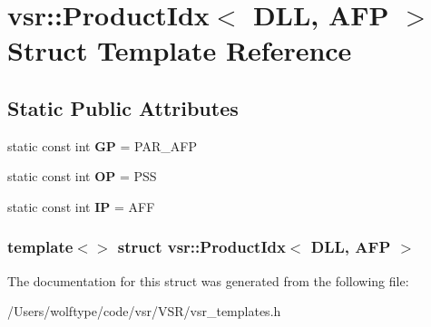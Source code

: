 \hypertarget{structvsr_1_1_product_idx_3_01_d_l_l_00_01_a_f_p_01_4}{\section{vsr\-:\-:Product\-Idx$<$ D\-L\-L, A\-F\-P $>$ Struct Template Reference}
\label{structvsr_1_1_product_idx_3_01_d_l_l_00_01_a_f_p_01_4}
}
\subsection*{Static Public Attributes}
\begin{DoxyCompactItemize}
\item 
\hypertarget{structvsr_1_1_product_idx_3_01_d_l_l_00_01_a_f_p_01_4_a6a031ae6a9d05221ce8925ab2350b038}{static const int {\bfseries G\-P} = P\-A\-R\-\_\-\-A\-F\-P}\label{structvsr_1_1_product_idx_3_01_d_l_l_00_01_a_f_p_01_4_a6a031ae6a9d05221ce8925ab2350b038}

\item 
\hypertarget{structvsr_1_1_product_idx_3_01_d_l_l_00_01_a_f_p_01_4_a88e29913cbc067cc4c5cafd1bbdc4f64}{static const int {\bfseries O\-P} = P\-S\-S}\label{structvsr_1_1_product_idx_3_01_d_l_l_00_01_a_f_p_01_4_a88e29913cbc067cc4c5cafd1bbdc4f64}

\item 
\hypertarget{structvsr_1_1_product_idx_3_01_d_l_l_00_01_a_f_p_01_4_a4fb85577319e46440b13f26845f40bb4}{static const int {\bfseries I\-P} = A\-F\-F}\label{structvsr_1_1_product_idx_3_01_d_l_l_00_01_a_f_p_01_4_a4fb85577319e46440b13f26845f40bb4}

\end{DoxyCompactItemize}
\subsubsection*{template$<$$>$ struct vsr\-::\-Product\-Idx$<$ D\-L\-L, A\-F\-P $>$}



The documentation for this struct was generated from the following file\-:\begin{DoxyCompactItemize}
\item 
/\-Users/wolftype/code/vsr/\-V\-S\-R/vsr\-\_\-templates.\-h\end{DoxyCompactItemize}
